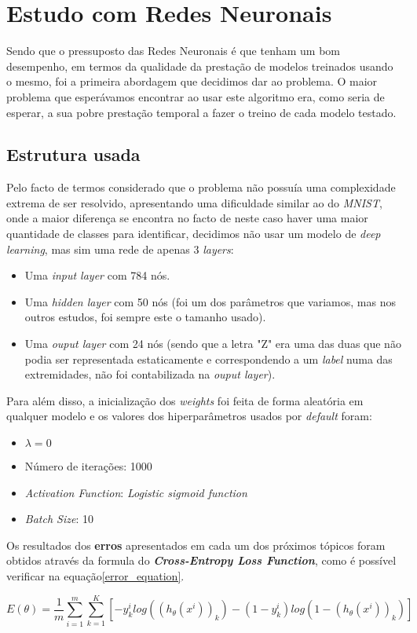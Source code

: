 \section{Estudo com Redes Neuronais}
Sendo que o pressuposto das Redes Neuronais é que tenham um bom desempenho, em termos da qualidade da prestação de modelos treinados usando o mesmo, foi a primeira abordagem que decidimos dar ao problema. O maior problema que esperávamos encontrar ao usar este algoritmo era, como seria de esperar, a sua pobre prestação temporal a fazer o treino de cada modelo testado.

\subsection{Estrutura usada}
Pelo facto de termos considerado que o problema não possuía uma complexidade extrema de ser resolvido, apresentando uma dificuldade similar ao do \textit{MNIST}, onde a maior diferença se encontra no facto de neste caso haver uma maior quantidade de classes para identificar, decidimos não usar um modelo de \textit{deep learning}, mas sim uma rede de apenas 3 \textit{layers}:
\begin{itemize}
\item Uma \textit{input layer} com 784 nós.
\item Uma \textit{hidden layer} com 50 nós (foi um dos parâmetros que variamos, mas nos outros estudos, foi sempre este o tamanho usado).
\item Uma \textit{ouput layer} com 24 nós (sendo que a letra "Z" era uma das duas que não podia ser representada estaticamente e correspondendo a um \textit{label} numa das extremidades, não foi contabilizada na \textit{ouput layer}).
\end{itemize}
Para além disso, a inicialização dos \textit{weights} foi feita de forma aleatória em qualquer modelo e os valores dos hiperparâmetros usados por \textit{default} foram:
\begin{itemize}
\item $\lambda = 0$
\item Número de iterações: 1000
\item \textit{Activation Function}: \textit{Logistic sigmoid function}
\item \textit{Batch Size}: 10
\end{itemize}
Os resultados dos \textbf{erros} apresentados em cada um dos próximos tópicos foram obtidos através da formula do \textbf{\textit{Cross-Entropy Loss Function}}, como é possível verificar na equação\ref{error_equation}.
\begin{figure*}[!t]
   \begin{equation}
		E(\theta) = \frac{1}{m}\sum_{i=1}^{m} \sum_{k=1}^{K} [-y_{k}^{i} log((h_{\theta}(x^{i}))_{k}) - (1 - y_{k}^{i}) log(1 - (h_{\theta}(x^{i}))_{k})]
        \label{error_equation}
	\end{equation}
\end{figure*}


